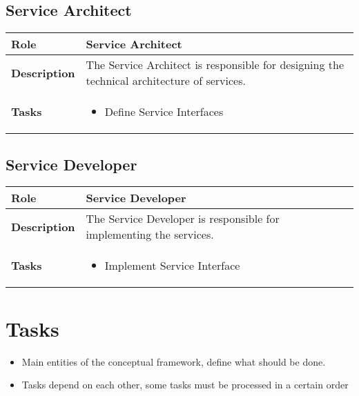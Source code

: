 \subsection{Service Architect}
\begin{minipage}{\textwidth}
 \label{table:ch6_Role_Service_Architect}
\begin{tabular}
	{|m{2cm}|m{10cm}|} \hline \bfseries Role & Service Architect\\
	\hline \bfseries Description & The Service Architect is responsible for designing the technical architecture of services.\\
	\hline \bfseries Tasks & 
	\begin{itemize}
		\item Define Service Interfaces
	\end{itemize}
	\\
	\hline 
\end{tabular}
\end{minipage}

\subsection{Service Developer}
\begin{minipage}{\textwidth}
 \label{table:ch6_Role_Service_Developer}
\begin{tabular}
	{|m{2cm}|m{10cm}|} \hline \bfseries Role & Service Developer\\
	\hline \bfseries Description & The Service Developer is responsible for implementing the services.\\
	\hline \bfseries Tasks & 
	\begin{itemize}
		\item Implement Service Interface
	\end{itemize}
	\\
	\hline 
\end{tabular}
\end{minipage}

\section{Tasks}
\label{sec:ch6_tasks}

\begin{itemize}
	\item Main entities of the conceptual framework, define what should be done.
	\item Tasks depend on each other, some tasks must be processed in a certain order
\end{itemize}

